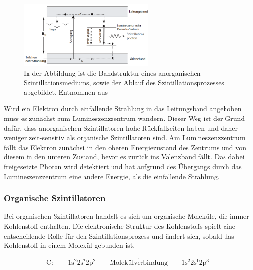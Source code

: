                 \FloatBarrier

                \begin{figure}[h]
                  \centering
                  \includegraphics[width = 0.6\textwidth]{pictures/Bandstruktur.png}
                  \caption{In der Abbildung ist die Bandstruktur eines anorganischen Szintillationsmediums, sowie der Ablauf des Szintillationsprozesses abgebildet. Entnommen aus \cite{kolanoski_teilchendetektoren_2016}}
                  \label{fig:Bandstruktur}
                \end{figure}
        
                \FloatBarrier
        
                \noindent

                Wird ein Elektron durch einfallende Strahlung in das Leitungsband angehoben muss es zunächst zum Lumineszenzzentrum wandern. Dieser Weg ist der Grund dafür, dass anorganischen Szintillatoren
                hohe Rückfallzeiten haben und daher weniger zeit-sensitiv als organische Szintillatoren sind. Am Lumineszenzzentrum fällt das Elektron zunächst in den oberen Energiezustand des Zentrums und
                von diesem in den unteren Zustand, bevor es zurück ins Valenzband fällt. Das dabei freigesetzte Photon wird detektiert und hat aufgrund des Übergangs durch das Lumineszenzzentrum eine andere 
                Energie, als die einfallende Strahlung.


            \subsubsection*{Organische Szintillatoren}
                Bei organischen Szintillatoren handelt es sich um organische Moleküle, die immer Kohlenstoff enthalten. Die elektronische Struktur des Kohlenstoffs spielt eine entscheidende Rolle für den
                Szintillationsprozess und ändert sich, sobald das Kohlenstoff in einem Molekül gebunden ist.

                \begin{equation*}
                    \text{C}: \qquad 1\text{s}^2 2\text{s}^2 2\text{p}^2 \qquad \underrightarrow{\text{Molekülverbindung}} \qquad 1\text{s}^2 2\text{s}^1 2\text{p}^3
                \end{equation*}

